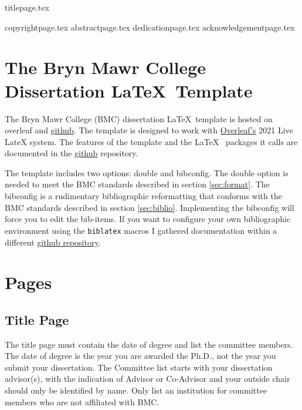 \documentclass[12pt]{report}
\begin{document}
{titlepage.tex} %

{copyrightpage.tex}
{abstractpage.tex}
\setcounter{page}{2}
{dedicationpage.tex}
{acknowledgementpage.tex}
\tableofcontents
\newpage
\listoffigures
{}
\newpage
\listoftables
{}
\newpage
\listofappendices
\newpage

\chapter{The Bryn Mawr College Dissertation \LaTeX~Template}
The Bryn Mawr College (BMC) dissertation \LaTeX~template is hosted on overleaf and \href{https://github.com/cacsphysics/BMC_Dissertation_Template}{github}. The template is designed to work with \href{https://www.overleaf.com/for/authors}{Overleaf's} 2021 Live LateX system. The features of the template and the \LaTeX~ packages it calls are documented in the \href{https://github.com/cacsphysics/BMC_Dissertation_Template}{github} repository.

The template includes two options: double and bibconfig. The double option is needed to meet the BMC standards described in section \ref{sec:format}. The bibconfig is a rudimentary bibliographic reformatting that conforms with the BMC standards described in section \ref{sec:biblio}. Implementing the bibconfig will force you to edit the bib-items. If you want to configure your own bibliographic environment using the \verb|biblatex| macros I gathered documentation within a different \href{https://github.com/cacsphysics/BMC_Template_Info_Files}{github repository}.

\chapter{Pages}
\section{Title Page}
The title page must contain the date of degree and list the committee members. The date of degree is the year you are awarded the Ph.D., not the year you submit your dissertation. The Committee list starts with your dissertation advisor(s), with the indication of Advisor or Co-Advisor and your outside chair should only be identified by name. Only list an institution for committee members who are not affiliated with BMC.
\end{document}

